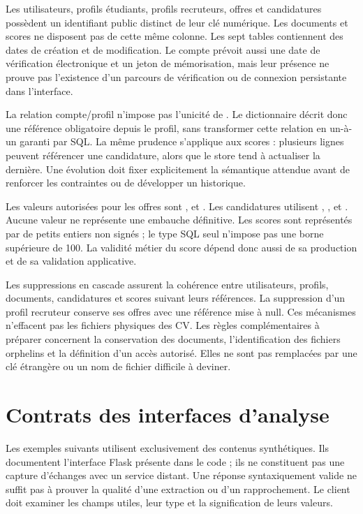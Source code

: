 Les utilisateurs, profils étudiants, profils recruteurs, offres et candidatures possèdent un identifiant public distinct de leur clé numérique. Les documents et scores ne disposent pas de cette même colonne. Les sept tables contiennent des dates de création et de modification. Le compte prévoit aussi une date de vérification électronique et un jeton de mémorisation, mais leur présence ne prouve pas l'existence d'un parcours de vérification ou de connexion persistante dans l'interface.

La relation compte/profil n'impose pas l'unicité de . Le dictionnaire décrit donc une référence obligatoire depuis le profil, sans transformer cette relation en un-à-un garanti par SQL. La même prudence s'applique aux scores : plusieurs lignes peuvent référencer une candidature, alors que le store tend à actualiser la dernière. Une évolution doit fixer explicitement la sémantique attendue avant de renforcer les contraintes ou de développer un historique.

Les valeurs autorisées pour les offres sont ,  et . Les candidatures utilisent , ,  et . Aucune valeur ne représente une embauche définitive. Les scores sont représentés par de petits entiers non signés ; le type SQL seul n'impose pas une borne supérieure de 100. La validité métier du score dépend donc aussi de sa production et de sa validation applicative.

Les suppressions en cascade assurent la cohérence entre utilisateurs, profils, documents, candidatures et scores suivant leurs références. La suppression d'un profil recruteur conserve ses offres avec une référence mise à null. Ces mécanismes n'effacent pas les fichiers physiques des CV. Les règles complémentaires à préparer concernent la conservation des documents, l'identification des fichiers orphelins et la définition d'un accès autorisé. Elles ne sont pas remplacées par une clé étrangère ou un nom de fichier difficile à deviner.

\chapter{Contrats des interfaces d'analyse}
\label{ann:api}

Les exemples suivants utilisent exclusivement des contenus synthétiques. Ils documentent l'interface Flask présente dans le code ; ils ne constituent pas une capture d'échanges avec un service distant. Une réponse syntaxiquement valide ne suffit pas à prouver la qualité d'une extraction ou d'un rapprochement. Le client doit examiner les champs utiles, leur type et la signification de leurs valeurs.

